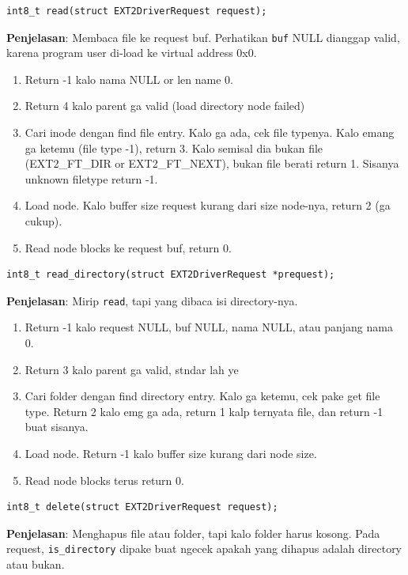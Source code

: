 \begin{lstlisting}
int8_t read(struct EXT2DriverRequest request);
\end{lstlisting}

\textbf{Penjelasan}:
Membaca file ke request buf. Perhatikan \texttt{buf} NULL dianggap valid, karena program user di-load ke virtual address 0x0.

\begin{enumerate}
    \item Return -1 kalo nama NULL or len name 0.
    \item Return 4 kalo parent ga valid (load directory node failed)
    \item Cari inode dengan find file entry. Kalo ga ada, cek file typenya. Kalo emang ga ketemu (file type -1), return 3. Kalo semisal dia bukan file (EXT2\_FT\_DIR or EXT2\_FT\_NEXT), bukan file berati return 1. Sisanya unknown filetype return -1.
    \item Load node. Kalo buffer size request kurang dari size node-nya, return 2 (ga cukup).
    \item Read node blocks ke request buf, return 0.
\end{enumerate}

\begin{lstlisting}
int8_t read_directory(struct EXT2DriverRequest *prequest);
\end{lstlisting}

\textbf{Penjelasan}:
Mirip \texttt{read}, tapi yang dibaca isi directory-nya.

\begin{enumerate}
    \item Return -1 kalo request NULL, buf NULL, nama NULL, atau panjang nama 0.
    \item Return 3 kalo parent ga valid, stndar lah ye
    \item Cari folder dengan find directory entry. Kalo ga ketemu, cek pake get file type. Return 2 kalo emg ga ada, return 1 kalp ternyata file, dan return -1 buat sisanya.
    \item Load node. Return -1 kalo buffer size kurang dari node size.
    \item Read node blocks terus return 0.
\end{enumerate}

\begin{lstlisting}
int8_t delete(struct EXT2DriverRequest request);
\end{lstlisting}

\textbf{Penjelasan}:
Menghapus file atau folder, tapi kalo folder harus kosong. Pada request, \texttt{is\_directory} dipake buat ngecek apakah yang dihapus adalah directory atau bukan.

